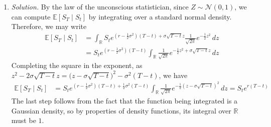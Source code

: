 \documentclass{article}
\numberwithin{equation}{section}
\begin{document}
\begin{enumerate}[label = \alph*.]
    \item
    \textit{Solution.} By the law of the unconscious statistician, since
    $ Z \sim \mathcal{N}(0, 1) $, we can compute $ \mathbb{E}[S_T \mid S_t] $
    by integrating over a standard normal density. Therefore, we may write
    \begin{equation*}
        \begin{split}
        \mathbb{E}[S_T \mid S_t] & = \int_\mathbb{R}S_te^{
            \left(r - \frac{1}{2}\sigma^2\right)(T - t) + \sigma\sqrt{T - t}z
        }\frac{1}{\sqrt{2\pi}}e^{-\frac{1}{2}z^2}\,dz \\
        & = S_te^{\left(r - \frac{1}{2}\sigma^2\right)(T - t)}
        \int_\mathbb{R}\frac{1}{\sqrt{2\pi}}e^{
            -\frac{1}{2}z^2 + \sigma\sqrt{T - t}z
        }\,dz
        \end{split}
    \end{equation*}
    Completing the square in the exponent, as $ z^2 - 2\sigma\sqrt{T - t}z =
    \big(z - \sigma\sqrt{T - t}\big)^2 - \sigma^2(T - t) $, we have
    \begin{equation*}
        \begin{split}
        \mathbb{E}[S_T \mid S_t] & = S_te^{
            \left(r - \frac{1}{2}\sigma^2\right)(T - t) +
            \frac{1}{2}\sigma^2(T - t)
        }
        \int_\mathbb{R}\frac{1}{\sqrt{2\pi}}e^{
            -\frac{1}{2}(z - \sigma\sqrt{T - t})^2
        }\,dz = S_te^{r(T - t)}
        \end{split}
    \end{equation*}
    The last step follows from the fact that the function being integrated is
    a Gaussian density, so by properties of density functions, its integral
    over $ \mathbb{R} $ must be $ 1 $.


\end{enumerate}
\end{document}
